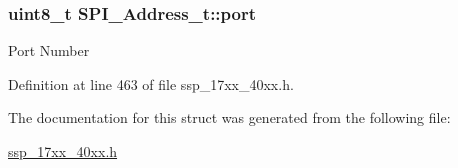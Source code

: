 \subsubsection[{\texorpdfstring{port}{port}}]{\setlength{\rightskip}{0pt plus 5cm}uint8\+\_\+t S\+P\+I\+\_\+\+Address\+\_\+t\+::port}\hypertarget{structSPI__Address__t_a64ccbaf37a32da0f13b46325b4b42c4d}{}\label{structSPI__Address__t_a64ccbaf37a32da0f13b46325b4b42c4d}
Port Number 

Definition at line 463 of file ssp\+\_\+17xx\+\_\+40xx.\+h.



The documentation for this struct was generated from the following file\+:\begin{DoxyCompactItemize}
\item 
\hyperlink{ssp__17xx__40xx_8h}{ssp\+\_\+17xx\+\_\+40xx.\+h}\end{DoxyCompactItemize}
